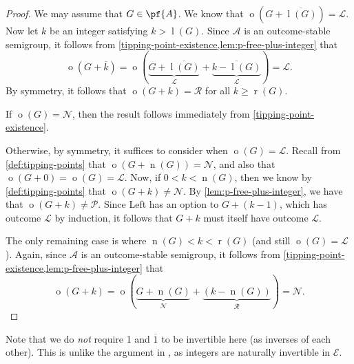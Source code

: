 \documentclass[11pt]{article}
\theoremstyle{definition}
\DeclareMathOperator{\outcome}{o}
\newcommand{\set}[1]{\mathcal{#1}}
\DeclareMathOperator{\ltp}{l}
\DeclareMathOperator{\ntp}{n}
\DeclareMathOperator{\rtp}{r}
\begin{document}
\begin{proof}
    We may assume that $G\in\pf{A}$. We know that
    $\outcome(G+\overline{\ltp(G)})=\mathscr{L}$. Now let $k$ be an integer
    satisfying $k>\ltp(G)$. Since $\set{A}$ is an outcome-stable semigroup, it
    follows from \cref{tipping-point-existence,lem:p-free-plus-integer} that
    \[
        \outcome(G+\overline{k})=
        \outcome(\underbrace{G+\overline{\ltp(G)}}_{\mathscr{L}}+
        \underbrace{\overline{k-\ltp(G)}}_{\mathscr{L}})=\mathscr{L}.
    \]
    By symmetry, it follows that $\outcome(G+k)=\mathscr{R}$ for all $k\geq
    \rtp(G)$.

    If $\outcome(G)=\mathscr{N}$, then the result follows immediately from
    \cref{tipping-point-existence}.

    Otherwise, by symmetry, it suffices to consider when
    $\outcome(G)=\mathscr{L}$. Recall from \cref{def:tipping-points} that
    $\outcome(G+\ntp(G))=\mathscr{N}$, and also that
    $\outcome(G+0)=\outcome(G)=\mathscr{L}$. Now, if $0<k<\ntp(G)$, then we
    know by \cref{def:tipping-points} that $\outcome(G+k)\neq\mathscr{N}$. By
    \cref{lem:p-free-plus-integer}, we have that
    $\outcome(G+k)\neq\mathscr{P}$. Since Left has an option to $G+(k-1)$,
    which has outcome $\mathscr{L}$ by induction, it follows that $G+k$ must
    itself have outcome $\mathscr{L}$.

    The only remaining case is where $\ntp(G)<k<\rtp(G)$ (and still
    $\outcome(G)=\mathscr{L}$). Again, since $\set{A}$ is an outcome-stable
    semigroup, it follows from
    \cref{tipping-point-existence,lem:p-free-plus-integer} that
    \[
        \outcome(G+k)=
        \outcome(\underbrace{G+\ntp(G)}_{\mathscr{N}}+
        \underbrace{(k-\ntp(G))}_{\mathscr{R}})=\mathscr{N}.
    \]
\end{proof}

Note that we do \emph{not} require 1 and $\overline{1}$ to be invertible here
(as inverses of each other). This is unlike the argument in
\cite[pp.~5--6]{milley.renault:invertible}, as integers are naturally
invertible in $\set{E}$.
\end{document}
